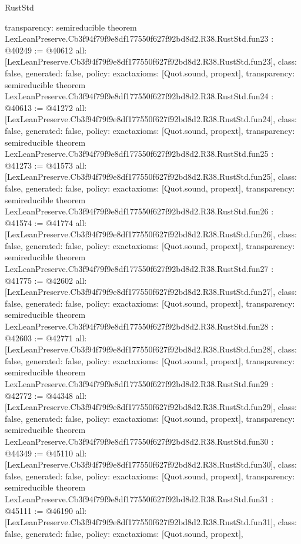\begin{lexlean}{RustStd}
\begin{coremodule}
{  transparency: semireducible
}
theorem LexLeanPreserve.Cb3f94f79f9e8df177550f627f92bd8d2.R38.RustStd.fun23 : @40249 := @40612 {
  all: [LexLeanPreserve.Cb3f94f79f9e8df177550f627f92bd8d2.R38.RustStd.fun23],
  class: false,
  generated: false,
  policy: exact{axioms: [Quot.sound, propext]},
  transparency: semireducible
}
theorem LexLeanPreserve.Cb3f94f79f9e8df177550f627f92bd8d2.R38.RustStd.fun24 : @40613 := @41272 {
  all: [LexLeanPreserve.Cb3f94f79f9e8df177550f627f92bd8d2.R38.RustStd.fun24],
  class: false,
  generated: false,
  policy: exact{axioms: [Quot.sound, propext]},
  transparency: semireducible
}
theorem LexLeanPreserve.Cb3f94f79f9e8df177550f627f92bd8d2.R38.RustStd.fun25 : @41273 := @41573 {
  all: [LexLeanPreserve.Cb3f94f79f9e8df177550f627f92bd8d2.R38.RustStd.fun25],
  class: false,
  generated: false,
  policy: exact{axioms: [Quot.sound, propext]},
  transparency: semireducible
}
theorem LexLeanPreserve.Cb3f94f79f9e8df177550f627f92bd8d2.R38.RustStd.fun26 : @41574 := @41774 {
  all: [LexLeanPreserve.Cb3f94f79f9e8df177550f627f92bd8d2.R38.RustStd.fun26],
  class: false,
  generated: false,
  policy: exact{axioms: [Quot.sound, propext]},
  transparency: semireducible
}
theorem LexLeanPreserve.Cb3f94f79f9e8df177550f627f92bd8d2.R38.RustStd.fun27 : @41775 := @42602 {
  all: [LexLeanPreserve.Cb3f94f79f9e8df177550f627f92bd8d2.R38.RustStd.fun27],
  class: false,
  generated: false,
  policy: exact{axioms: [Quot.sound, propext]},
  transparency: semireducible
}
theorem LexLeanPreserve.Cb3f94f79f9e8df177550f627f92bd8d2.R38.RustStd.fun28 : @42603 := @42771 {
  all: [LexLeanPreserve.Cb3f94f79f9e8df177550f627f92bd8d2.R38.RustStd.fun28],
  class: false,
  generated: false,
  policy: exact{axioms: [Quot.sound, propext]},
  transparency: semireducible
}
theorem LexLeanPreserve.Cb3f94f79f9e8df177550f627f92bd8d2.R38.RustStd.fun29 : @42772 := @44348 {
  all: [LexLeanPreserve.Cb3f94f79f9e8df177550f627f92bd8d2.R38.RustStd.fun29],
  class: false,
  generated: false,
  policy: exact{axioms: [Quot.sound, propext]},
  transparency: semireducible
}
theorem LexLeanPreserve.Cb3f94f79f9e8df177550f627f92bd8d2.R38.RustStd.fun30 : @44349 := @45110 {
  all: [LexLeanPreserve.Cb3f94f79f9e8df177550f627f92bd8d2.R38.RustStd.fun30],
  class: false,
  generated: false,
  policy: exact{axioms: [Quot.sound, propext]},
  transparency: semireducible
}
theorem LexLeanPreserve.Cb3f94f79f9e8df177550f627f92bd8d2.R38.RustStd.fun31 : @45111 := @46190 {
  all: [LexLeanPreserve.Cb3f94f79f9e8df177550f627f92bd8d2.R38.RustStd.fun31],
  class: false,
  generated: false,
  policy: exact{axioms: [Quot.sound, propext]},
}
\end{coremodule}
\end{lexlean}
